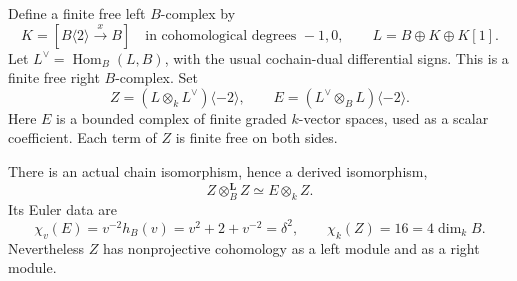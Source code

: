 Define a finite free left \(B\)-complex by
\[
 K=[B\langle2\rangle\xrightarrow{x}B]
       \quad\text{in cohomological degrees }-1,0,
 \qquad L=B\oplus K\oplus K[1].
\]
Let \(L^\vee=\operatorname{Hom}_B(L,B)\), with the
usual cochain-dual differential signs. This is a
finite free right \(B\)-complex. Set
\begin{equation}\label{eq:QRZE}
 Z=(L\otimes_k L^\vee)\langle-2\rangle,
 \qquad
 E=(L^\vee\otimes_B L)\langle-2\rangle.
\end{equation}
Here \(E\) is a bounded complex of finite graded
\(k\)-vector spaces, used as a scalar coefficient.
Each term of \(Z\) is finite free on both sides.

\begin{finding}\label{prop:QRfinitecountermodel}
There is an actual chain isomorphism, hence a
derived isomorphism,
\begin{equation}\label{eq:QRquadratic}
        Z\otimes_B^{\mathbf L}Z\simeq E\otimes_k Z.
\end{equation}
Its Euler data are
\begin{equation}\label{eq:QREuler}
 \chi_v(E)=v^{-2}h_B(v)=v^2+2+v^{-2}=\delta^2,
 \qquad \chi_k(Z)=16=4\dim_k B.
\end{equation}
Nevertheless \(Z\) has nonprojective cohomology
as a left module and as a right module.
\end{finding}

